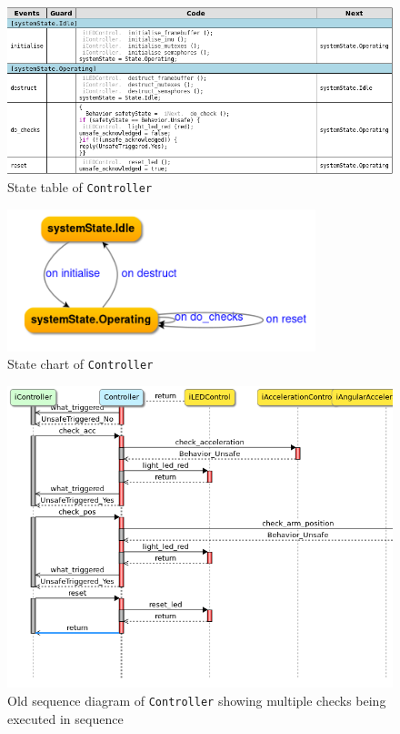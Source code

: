 \documentclass[12pt]{scrreprt}
\begin{document}
\begin{appendices}
\begin{figure}[H]
    \centering
    \includegraphics[width=\textwidth]{Figures/results/modelling_figures/Controller/Controller_state_table.png}
    \caption{State table of \texttt{Controller}}
    \label{fig:controll_state_table}
\end{figure}


\begin{figure}[H]
    \centering
    \includegraphics[width=0.8\textwidth]{Figures/results/modelling_figures/Controller/Controller_state_chart.png}
    \caption{State chart of \texttt{Controller}}
    \label{fig:controll_old}
\end{figure}


\begin{figure}[H]
    \centering
    \includegraphics[width=\textwidth]{Figures/results/modelling_figures/Controller/old_Controller_seq.png}
    \caption{Old sequence diagram of \texttt{Controller} showing multiple checks being executed in sequence}
    \label{fig:controll_old}
\end{figure}




\end{appendices}
\end{document}
